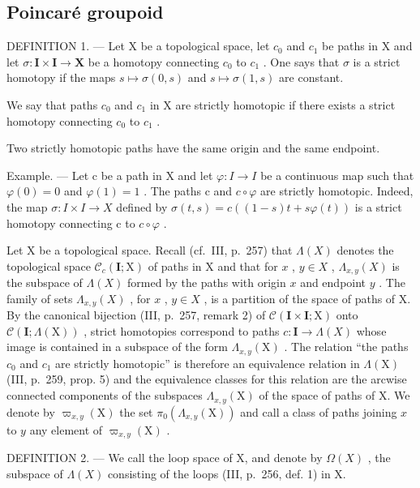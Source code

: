\subsection{Poincaré groupoid}

DEFINITION 1. --- Let X be a topological space, let \(c_{0}\) and \(c_{1}\) be paths in X and let \(\sigma\colon\mathbf{I}\times\mathbf{I}\to\mathbf{X}\) be a homotopy connecting \(c_{0}\) to \(c_{1}\) . One says that \(\sigma\) is a strict homotopy if the maps \(s\mapsto\sigma(0,s)\) and \(s\mapsto\sigma(1,s)\) are constant.

We say that paths \(c_{0}\) and \(c_{1}\) in X are strictly homotopic if there exists a strict homotopy connecting \(c_{0}\) to \(c_{1}\) .

Two strictly homotopic paths have the same origin and the same endpoint.

Example. --- Let c be a path in X and let \(\varphi\colon I\to I\) be a continuous map such that \(\varphi(0)=0\) and \(\varphi(1)=1\) . The paths c and \(c\circ\varphi\) are strictly homotopic. Indeed, the map \(\sigma\colon I\times I\to X\) defined by \(\sigma(t,s)=c((1-s)t+s\varphi(t))\) is a strict homotopy connecting c to \(c\circ\varphi\) .

Let X be a topological space. Recall (cf.~III, p.~257) that \(\Lambda(X)\) denotes the topological space \(\mathcal{C}_c(\mathbf{I};\mathrm{X})\) of paths in X and that for \(x\) , \(y \in X\) , \(\Lambda_{x,y}(X)\) is the subspace of \(\Lambda(X)\) formed by the paths with origin \(x\) and endpoint \(y\) . The family of sets \(\Lambda_{x,y}(X)\) , for \(x\) , \(y \in X\) , is a partition of the space of paths of X. By the canonical bijection (III, p.~257, remark 2) of \(\mathcal{C}(\mathbf{I} \times \mathbf{I};\mathrm{X})\) onto \(\mathcal{C}(\mathbf{I};\Lambda(\mathrm{X}))\) , strict homotopies correspond to paths \(c: \mathbf{I} \to \Lambda(X)\) whose image is contained in a subspace of the form \(\Lambda_{x,y}(\mathrm{X})\) . The relation “the paths \(c_0\) and \(c_1\) are strictly homotopic” is therefore an equivalence relation in \(\Lambda(\mathrm{X})\) (III, p.~259, prop. 5) and the equivalence classes for this relation are the arcwise connected components of the subspaces \(\Lambda_{x,y}(\mathrm{X})\) of the space of paths of X. We denote by \(\varpi_{x,y}(\mathrm{X})\) the set \(\pi_0(\Lambda_{x,y}(\mathrm{X}))\) and call a class of paths joining \(x\) to \(y\) any element of \(\varpi_{x,y}(\mathrm{X})\) .

DEFINITION 2. --- We call the loop space of X, and denote by \(\Omega(X)\) , the subspace of \(\Lambda(X)\) consisting of the loops (III, p.~256, def. 1) in X.

